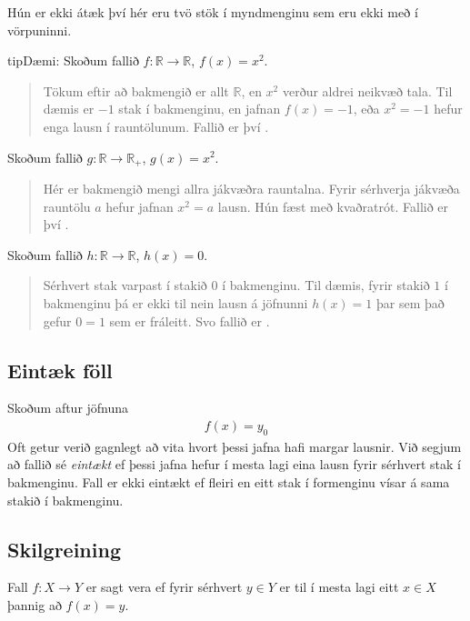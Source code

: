 \documentclass[a4paper,10pt,icelandic]{sphinxmanual}
\begin{document}
Hún er ekki átæk því hér eru tvö stök í myndmenginu sem eru ekki með í vörpuninni.

\begin{sphinxadmonition}{tip}{Dæmi:}
 Skoðum fallið \(f: \mathbb{R} \to \mathbb{R}\), \(f(x)=x^2\).
\begin{quote}

Tökum eftir að bakmengið er allt \(\mathbb{R}\), en \(x^2\) verður aldrei neikvæð tala. Til dæmis er \(-1\) stak í bakmenginu, en jafnan \(f(x)=-1\), eða \(x^2=-1\) hefur enga lausn í rauntölunum. Fallið er því .
\end{quote}

 Skoðum fallið \(g: \mathbb{R} \to \mathbb{R}_+\), \(g(x)=x^2\).
\begin{quote}

Hér er bakmengið mengi allra jákvæðra rauntalna. Fyrir sérhverja jákvæða rauntölu \(a\) hefur jafnan \(x^2=a\) lausn. Hún fæst með kvaðratrót. Fallið er því .
\end{quote}

 Skoðum fallið \(h: \mathbb{R} \to \mathbb{R}\), \(h(x)=0\).
\begin{quote}

Sérhvert stak varpast í stakið \(0\) í bakmenginu. Til dæmis, fyrir stakið \(1\) í bakmenginu þá er ekki til nein lausn á jöfnunni \(h(x)=1\) þar sem það gefur \(0=1\) sem er fráleitt. Svo fallið er .
\end{quote}
\end{sphinxadmonition}


\subsection{Eintæk föll}
\label{\detokenize{Kafli09:eintaek-foll}}
Skoðum aftur jöfnuna
\begin{equation*}
\begin{split}f(x)=y_0\end{split}
\end{equation*}
Oft getur verið gagnlegt að vita hvort þessi jafna hafi margar lausnir.
Við segjum að fallið sé \textit{eintækt} ef þessi jafna hefur í mesta lagi eina lausn fyrir sérhvert stak í bakmenginu.
Fall er ekki eintækt ef fleiri en eitt stak í formenginu vísar á sama stakið í bakmenginu.


\subsection{Skilgreining}
\label{\detokenize{Kafli09:id1}}
Fall \(f: X \to Y\) er sagt vera  ef fyrir sérhvert \(y \in Y\) er til í mesta lagi eitt \(x \in X\) þannig að \(f(x)=y\).
\end{document}
